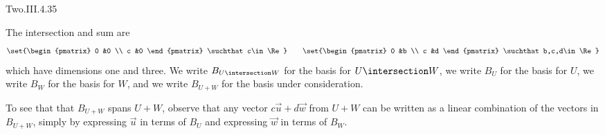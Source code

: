 \begin{ans}{Two.III.4.35}
      \begin{exparts}
        \partsitem The intersection and sum are
          \begin{equation*}
             \set{\begin{pmatrix}
                    0  &0  \\
                    c  &0
                  \end{pmatrix} \suchthat c\in\Re  }
             \qquad
             \set{\begin{pmatrix}
                    0  &b  \\
                    c  &d
                   \end{pmatrix} \suchthat b,c,d\in\Re  }
          \end{equation*}
        which have dimensions one and three.
      \partsitem We write $B_{U\intersection W}$ for the basis for
        $U\intersection W$,
        we write $B_U$ for the basis for $U$,
        we write $B_W$ for the basis for $W$,
        and we write $B_{U+W}$ for the basis under consideration.

        To see that that $B_{U+W}$ spans $U+W$, observe that
        any vector $c\vec{u}+d\vec{w}$ from $U+W$ can be written as a linear
        combination of the vectors in $B_{U+W}$,
        simply by expressing $\vec{u}$ in
        terms of $B_U$ and expressing $\vec{w}$ in terms of $B_W$.


\end{exparts}
\end{ans}
